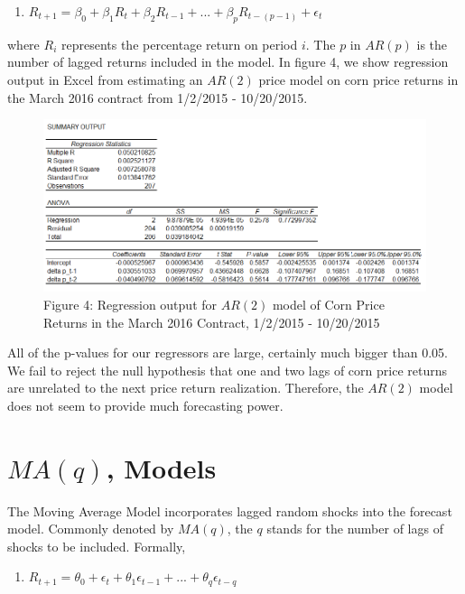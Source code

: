 \documentclass[]{book}
\providecommand{\tightlist}{%
  \setlength{\itemsep}{0pt}\setlength{\parskip}{0pt}}
\theoremstyle{definition}
\theoremstyle{definition}
\theoremstyle{remark}
\begin{document}
\begin{enumerate}
\def\labelenumi{\arabic{enumi}.}
\tightlist
\item
  \(R_{t+1} = \beta_0 + \beta_1R_{t} + \beta_2R_{t-1}+ ... + \beta_{p}R_{t-(p-1)} + \epsilon_t\)
\end{enumerate}

where \(R_i\) represents the percentage return on period \(i\). The
\(p\) in \(AR(p)\) is the number of lagged returns included in the
model. In figure 4, we show regression output in Excel from estimating
an \(AR(2)\) price model on corn price returns in the March 2016
contract from 1/2/2015 - 10/20/2015.

\begin{figure}[htbp]
\centering
\includegraphics{images/12_corn_ar2_output.png}
\caption{Figure 4: Regression output for \(AR(2)\) model of Corn Price
Returns in the March 2016 Contract, 1/2/2015 - 10/20/2015}
\end{figure}

All of the p-values for our regressors are large, certainly much bigger
than 0.05. We fail to reject the null hypothesis that one and two lags
of corn price returns are unrelated to the next price return
realization. Therefore, the \(AR(2)\) model does not seem to provide
much forecasting power.

\section{\texorpdfstring{\(MA(q)\),
Models}{MA(q), Models}}\label{maq-models}

The Moving Average Model incorporates lagged random shocks into the
forecast model. Commonly denoted by \(MA(q)\), the \(q\) stands for the
number of lags of shocks to be included. Formally,

\begin{enumerate}
\def\labelenumi{\arabic{enumi}.}
\setcounter{enumi}{1}
\tightlist
\item
  \(R_{t+1} = \theta_0 + \epsilon_t + \theta_1\epsilon_{t-1} + ... + \theta_q\epsilon_{t-q}\)
\end{enumerate}
\end{document}
